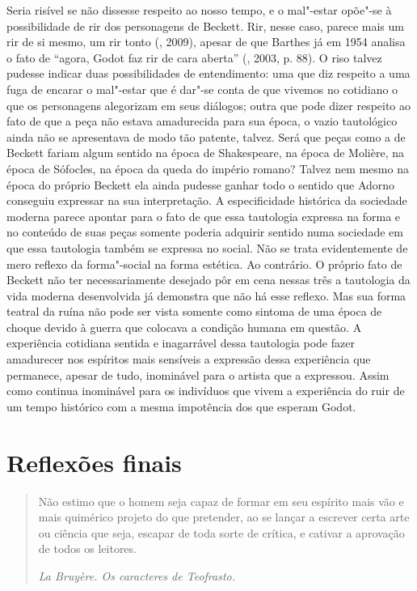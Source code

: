 Seria risível se não dissesse respeito ao nosso tempo, e o mal"-estar
opõe"-se à possibilidade de rir dos personagens de Beckett. Rir, nesse
caso, parece mais um rir de si mesmo, um rir tonto (, 2009),
apesar de que Barthes já em 1954 analisa o fato de ``agora, Godot faz
rir de cara aberta'' (, 2003, p. 88). O riso talvez pudesse
indicar duas possibilidades de entendimento: uma que diz respeito a uma
fuga de encarar o mal"-estar que é dar"-se conta de que vivemos no
cotidiano o que os personagens alegorizam em seus diálogos; outra que
pode dizer respeito ao fato de que a peça não estava amadurecida para
sua época, o vazio tautológico ainda não se apresentava de modo tão
patente, talvez. Será que peças como a de Beckett fariam algum sentido
na época de Shakespeare, na época de Molière, na época de Sófocles, na
época da queda do império romano? Talvez nem mesmo na época do próprio
Beckett ela ainda pudesse ganhar todo o sentido que Adorno conseguiu
expressar na sua interpretação. A especificidade histórica da sociedade
moderna parece apontar para o fato de que essa tautologia expressa na
forma e no conteúdo de suas peças somente poderia adquirir sentido numa
sociedade em que essa tautologia também se expressa no social. Não se
trata evidentemente de mero reflexo da forma"-social na forma estética.
Ao contrário. O próprio fato de Beckett não ter necessariamente desejado
pôr em cena nessas três a tautologia da vida moderna desenvolvida já
demonstra que não há esse reflexo. Mas sua forma teatral da ruína não
pode ser vista somente como sintoma de uma época de choque devido à
guerra que colocava a condição humana em questão. A experiência
cotidiana sentida e inagarrável dessa tautologia pode fazer amadurecer
nos espíritos mais sensíveis a expressão dessa experiência que
permanece, apesar de tudo, inominável para o artista que a expressou.
Assim como continua inominável para os indivíduos que vivem a
experiência do ruir de um tempo histórico com a mesma impotência dos que
esperam Godot.

\chapter{Reflexões finais}

\begin{quote}
Não estimo que o homem seja capaz de formar em seu espírito mais vão e
mais quimérico projeto do que pretender, ao se lançar a escrever certa
arte ou ciência que seja, escapar de toda sorte de crítica, e cativar a
aprovação de todos os leitores.

\emph{La Bruyère. Os caracteres de Teofrasto.}
\end{quote}

